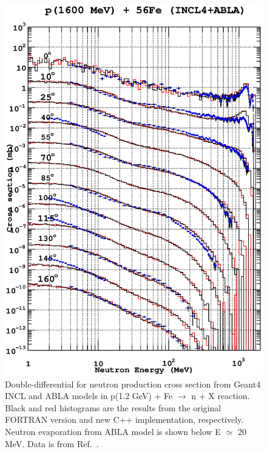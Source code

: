 \documentclass[a4paper]{jpconf}
\begin{document}
\begin{figure}
\begin{center}
\includegraphics[scale=0.70]{images/proton1600MeVFe.eps}
\caption{Double-differential for neutron production cross section
    from Geant4 INCL and ABLA models in p(1.2 GeV) + Fe $\rightarrow$ n + X reaction.
Black and red histograms are the
    results from the original FORTRAN version and new C++ implementation, respectively. 
Neutron evaporation from ABLA model is shown below E $\simeq$ 20 MeV.
Data is from Ref.~\cite{data}.}
\label{fig:neutronAl}
\end{center}
\end{figure}


\end{document}
